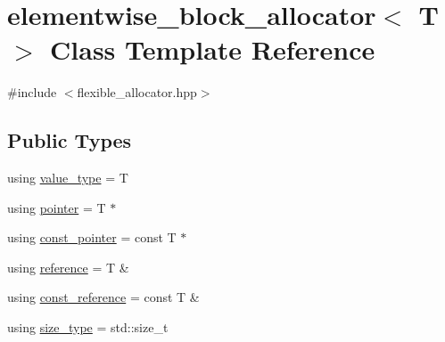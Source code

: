 \hypertarget{classelementwise__block__allocator}{}\section{elementwise\+\_\+block\+\_\+allocator$<$ T $>$ Class Template Reference}
\label{classelementwise__block__allocator}


{\ttfamily \#include $<$flexible\+\_\+allocator.\+hpp$>$}

\subsection*{Public Types}
\begin{DoxyCompactItemize}
\item 
using \hyperlink{classelementwise__block__allocator_aa2cd647e579b49a8640c13ff73fef25b}{value\+\_\+type} = T
\item 
using \hyperlink{classelementwise__block__allocator_af41c83aed240eb55e53155abdd714ec6}{pointer} = T $\ast$
\item 
using \hyperlink{classelementwise__block__allocator_a9382f12bfa2ba50e989f2f84216f44f1}{const\+\_\+pointer} = const T $\ast$
\item 
using \hyperlink{classelementwise__block__allocator_a7bfdf1ff6d23bcd486ef3c6541f738f2}{reference} = T \&
\item 
using \hyperlink{classelementwise__block__allocator_af7d02fdeb779527f9cc8723f8cebc40b}{const\+\_\+reference} = const T \&
\item 
using \hyperlink{classelementwise__block__allocator_a5a93e8060385c80ebaa62ec6e1b0d37e}{size\+\_\+type} = std\+::size\+\_\+t
\end{DoxyCompactItemize}
